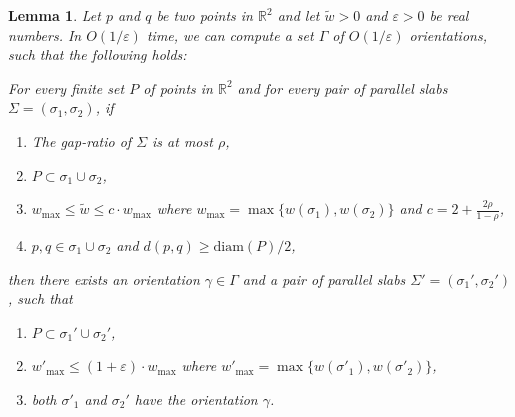 \documentclass[10pt,a4paper]{article}
\newtheorem{lemma}[theorem]{Lemma}
\theoremstyle{star}
\theoremstyle{claimstar}
\newcommand{\eps}{\ensuremath{\varepsilon}}
\newcommand{\diam}{\ensuremath{\mathrm{diam}}}
\begin{document}




\begin{lemma}
    \label{lem:parallel_angles}
    Let $p$ and $q$ be two points in $\mathbb R^2$ and let $\widetilde w > 0$ and $\eps> 0$ be real numbers.
    In $O(1/\eps)$ time, we can compute a set $\Gamma$ of $O(1/\eps)$ orientations, such that the following holds:
    
    For every finite set $P$ of points in $\mathbb R^2$ and for every pair of parallel slabs $\Sigma= (\sigma_1, \sigma_2)$, if 
    \begin{enumerate}[(1)]
        \item The gap-ratio of $\Sigma$ is at most $\rho$, 
        \item $P\subset \sigma_1 \cup \sigma_2$, 
        \item $w_{\max} \le \widetilde w \le c\cdot w_{\max}$ where $w_{\max} = \max \{w(\sigma_1), w(\sigma_2) \}$ and $c = 2 + \frac{2\rho}{1-\rho}$,
        \item $p, q \in \sigma_1 \cup \sigma_2$ and $d(p,q) \ge \diam(P)/2$,
    \end{enumerate}
    then there exists an orientation $\gamma \in \Gamma$ and  a pair of parallel slabs $\Sigma' = (\sigma_1', \sigma_2')$, such that
    \begin{enumerate}[(1)]
        \item $P \subset \sigma_1' \cup \sigma_2'$,
        \item $w'_{\max} \le (1+ \eps) \cdot w_{\max}$ where $w'_{\max} = \max \{w(\sigma'_1), w(\sigma'_2) \}$,
        \item both $\sigma'_1$ and $\sigma_2'$ have the orientation $\gamma$.
    \end{enumerate}
\end{lemma}
\end{document}
